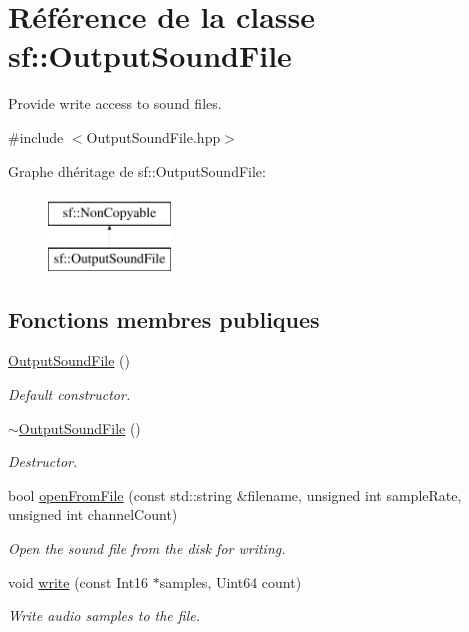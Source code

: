 \hypertarget{classsf_1_1OutputSoundFile}{}\section{Référence de la classe sf\+:\+:Output\+Sound\+File}
\label{classsf_1_1OutputSoundFile}


Provide write access to sound files.  




{\ttfamily \#include $<$Output\+Sound\+File.\+hpp$>$}

Graphe d\textquotesingle{}héritage de sf\+:\+:Output\+Sound\+File\+:\begin{figure}[H]
\begin{center}
\leavevmode
\includegraphics[height=2.000000cm]{classsf_1_1OutputSoundFile}
\end{center}
\end{figure}
\subsection*{Fonctions membres publiques}
\begin{DoxyCompactItemize}
\item 
\mbox{\label{classsf_1_1OutputSoundFile_a7ae9f2dbd0991fa9394726a3d58bb19e}} 
\hyperlink{classsf_1_1OutputSoundFile_a7ae9f2dbd0991fa9394726a3d58bb19e}{Output\+Sound\+File} ()
\begin{DoxyCompactList}\small\item\em Default constructor. \end{DoxyCompactList}\item 
\hyperlink{classsf_1_1OutputSoundFile_a1492adbfef1f391d720afb56f068182e}{$\sim$\+Output\+Sound\+File} ()
\begin{DoxyCompactList}\small\item\em Destructor. \end{DoxyCompactList}\item 
bool \hyperlink{classsf_1_1OutputSoundFile_ae5e55f01c53c1422c44eaed2eed67fce}{open\+From\+File} (const std\+::string \&filename, unsigned int sample\+Rate, unsigned int channel\+Count)
\begin{DoxyCompactList}\small\item\em Open the sound file from the disk for writing. \end{DoxyCompactList}\item 
void \hyperlink{classsf_1_1OutputSoundFile_adfcf525fced71121f336fa89faac3d67}{write} (const Int16 $\ast$samples, Uint64 count)
\begin{DoxyCompactList}\small\item\em Write audio samples to the file. \end{DoxyCompactList}\end{DoxyCompactItemize}


